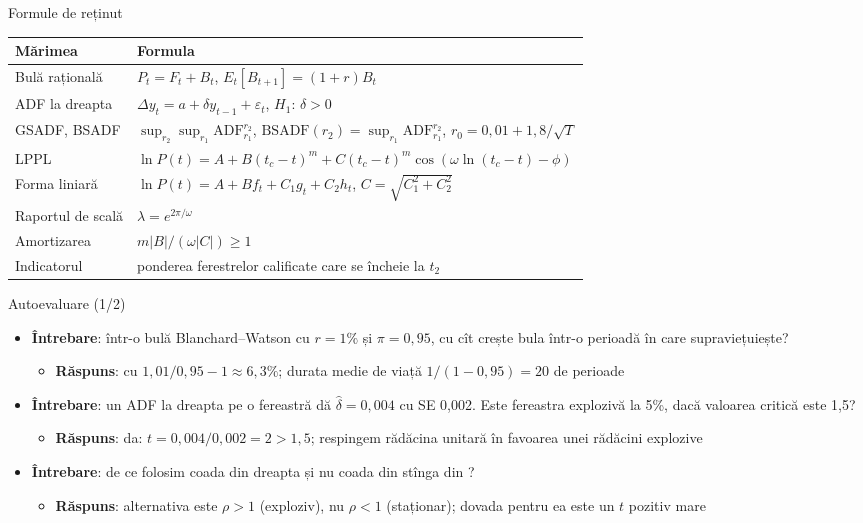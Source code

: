 \begin{frame}{Formule de reținut}
\itemsize{\small}
{\renewcommand{\arraystretch}{1.35}\begin{center}
\footnotesize
\begin{tabular}{ll}
\toprule
\textbf{Mărimea} & \textbf{Formula} \\
\midrule
Bulă rațională & $P_t = F_t + B_t$, \quad $E_t[B_{t+1}] = (1+r)B_t$ \\
ADF la dreapta & $\Delta y_t = a + \delta y_{t-1} + \varepsilon_t$, \quad $H_1$: $\delta > 0$ \\
GSADF, BSADF & $\sup_{r_2}\sup_{r_1}\mathrm{ADF}_{r_1}^{r_2}$, \quad $\mathrm{BSADF}(r_2) = \sup_{r_1}\mathrm{ADF}_{r_1}^{r_2}$, \quad $r_0 = 0{,}01 + 1{,}8/\sqrt T$ \\
LPPL & $\ln P(t) = A + B(t_c - t)^m + C(t_c - t)^m\cos(\omega\ln(t_c - t) - \phi)$ \\
Forma liniară & $\ln P(t) = A + Bf_t + C_1g_t + C_2h_t$, \quad $C = \sqrt{C_1^2 + C_2^2}$ \\
Raportul de scală & $\lambda = e^{2\pi/\omega}$ \\
Amortizarea & $m|B|/(\omega|C|) \ge 1$ \\
Indicatorul & ponderea ferestrelor calificate care se încheie la $t_2$ \\
\bottomrule
\end{tabular}
\end{center}
}
\end{frame}

\begin{frame}{Autoevaluare (1/2)}
\itemsize{\small}
\begin{itemize}
    \item \textbf{Întrebare}: într-o bulă Blanchard--Watson cu $r = 1\%$ și $\pi = 0{,}95$, cu cît crește bula într-o perioadă în care supraviețuiește?
    \begin{itemize}
        \item \textbf{Răspuns}: cu $1{,}01/0{,}95 - 1 \approx 6{,}3\%$; durata medie de viață $1/(1 - 0{,}95) = 20$ de perioade
    \end{itemize}
    \item \textbf{Întrebare}: un ADF la dreapta pe o fereastră dă $\hat\delta = 0{,}004$ cu SE 0,002. Este fereastra explozivă la 5\%, dacă valoarea critică este 1,5?
    \begin{itemize}
        \item \textbf{Răspuns}: da: $t = 0{,}004/0{,}002 = 2 > 1{,}5$; respingem rădăcina unitară în favoarea unei rădăcini explozive
    \end{itemize}
    \item \textbf{Întrebare}: de ce folosim coada din dreapta și nu coada din stînga din ?
    \begin{itemize}
        \item \textbf{Răspuns}: alternativa este $\rho > 1$ (exploziv), nu $\rho < 1$ (staționar); dovada pentru ea este un $t$ pozitiv mare
    \end{itemize}
\end{itemize}
\end{frame}

